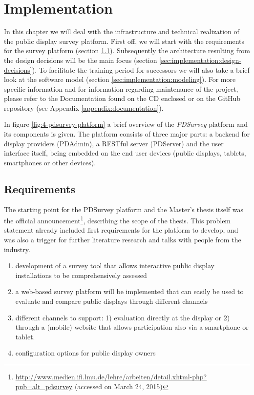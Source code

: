 \section{Implementation}
\label{sec:implementation}

	In this chapter we will deal with the infrastructure and technical realization of the public display survey platform. First off, we will start with the requirements for the survey platform (section \ref{sec:implementation:requirements}). Subsequently the architecture resulting from the design decisions will be the main focus (section \ref{sec:implementation:design-decisions}). To facilitate the training period for successors we will also take a brief look at the software model (section \ref{sec:implementation:modeling}). For more specific information and for information regarding maintenance of the project, please refer to the Documentation found on the CD enclosed or on the GitHub repository (see Appendix \ref{appendix:documentation}).

	In figure \ref{fig:4-pdsurvey-platform} a brief overview of the \textit{PDSurvey} platform and its components is given. The platform consists of three major parts: a backend for display providers (PDAdmin), a RESTful server (PDServer) and the user interface itself, being embedded on the end user devices (public displays, tablets, smartphones or other devices). 






\subsection{Requirements}
\label{sec:implementation:requirements}

	The starting point for the PDSurvey platform and the Master's thesis itself was the official announcement\footnote{\url{http://www.medien.ifi.lmu.de/lehre/arbeiten/detail.xhtml-php?pub=alt_pdsurvey} (accessed on March 24, 2015)}, describing the scope of the thesis. This problem statement already included first requirements for the platform to develop, and was also a trigger for further literature research and talks with people from the industry.

	\begin{enumerate}[itemsep=0pt] 
	\item development of a survey tool that allows interactive public display installations to be comprehensively assessed 
	\item a web-based survey platform will be implemented that can easily be used to evaluate and compare public displays through different channels 
	\item different channels to support: 1) evaluation directly at
	the display or 2) through a (mobile) website that allows participation also via a smartphone
	or tablet.
	\item configuration options for public display owners
	\end{enumerate}


